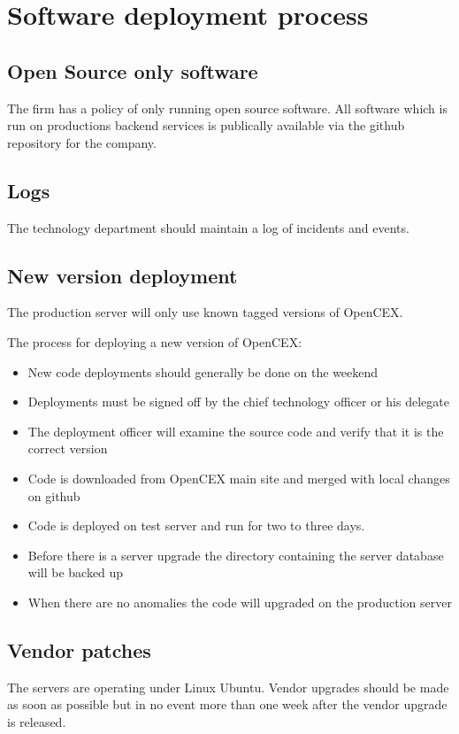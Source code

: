 \section{Software deployment process}
\subsection{Open Source only software}

The firm has a policy of only running open source software.  All
software which is run on productions backend services is publically
available via the github repository for the company.

\subsection{Logs}
The technology department should maintain a log of incidents and
events.

\subsection{New version deployment}
The production server will only use known tagged versions of OpenCEX.

The process for deploying a new version of OpenCEX:
\begin{itemize}
  \item New code deployments should generally be done on the weekend
  \item Deployments must be signed off by the chief technology officer
    or his delegate
  \item The deployment officer will examine the source code and verify
    that it is the correct version
  \item Code is downloaded from OpenCEX main site and merged with
    local changes on github
  \item Code is deployed on test server and run for two to three days.
  \item Before there is a server upgrade the directory containing the
    server database will be backed up
  \item When there are no anomalies the code will upgraded on the
    production server
\end{itemize}
    
\subsection{Vendor patches}
The servers are operating under Linux Ubuntu.  Vendor upgrades should
be made as soon as possible but in no event more than one week after
the vendor upgrade is released.

